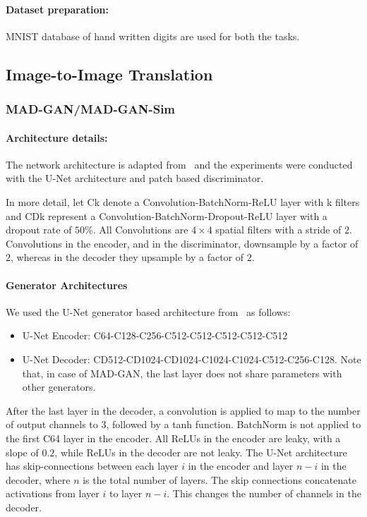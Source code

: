 \paragraph{Dataset preparation:} MNIST database of hand written digits are used for both the tasks.

\subsection{Image-to-Image Translation}
\subsubsection{MAD-GAN/MAD-GAN-Sim}
\paragraph{Architecture details:}
The network architecture is adapted from~\cite{isola2016image2image} and the experiments were conducted with the U-Net architecture and patch based discriminator.

In more detail, let Ck denote a Convolution-BatchNorm-ReLU layer with k filters and CDk represent a Convolution-BatchNorm-Dropout-ReLU layer with a dropout rate of $50$\%. All Convolutions are $4\times 4$ spatial filters with a stride of $2$. Convolutions in the encoder, and in the discriminator, downsample by a factor of $2$, whereas in the decoder they upsample by a factor of $2$.

\paragraph{Generator Architectures}
We used the U-Net generator based architecture from~\cite{isola2016image2image} as follows:

\begin{itemize}
	\item U-Net Encoder: C64-C128-C256-C512-C512-C512-C512-C512
	\item U-Net Decoder: CD512-CD1024-CD1024-C1024-C1024-C512-C256-C128. Note that, in case of MAD-GAN, the last layer does not share parameters with other generators.
\end{itemize}
After the last layer in the decoder, a convolution is applied to map to the number of output channels to $3$, followed by a tanh function. BatchNorm is not applied to the first C64 layer in the encoder. All ReLUs in the encoder are leaky, with a slope of $0.2$, while ReLUs in the decoder are not leaky. The U-Net architecture has skip-connections between each layer $i$ in the encoder and layer $n-i$ in the decoder, where $n$ is the total number of layers. The skip connections concatenate activations from layer $i$ to layer $n-i$. This changes the number of channels in the decoder.

